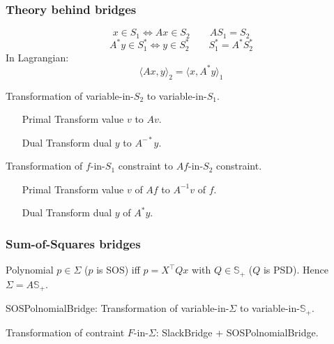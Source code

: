 \documentclass{beamer}
\begin{document}
  \begin{frame}
    \frametitle{Theory behind bridges}
    \[ x \in S_1 \Leftrightarrow Ax \in S_2 \qquad AS_1 = S_2 \]
    \[ A^* y \in S_1^* \Leftrightarrow y \in S_2^* \qquad S_1^* = A^* S_2^* \]
    In Lagrangian:
    \[ \langle Ax, y \rangle_2 = \langle x, A^* y \rangle_1 \]
    \vspace{-0.5cm}
    \begin{block}{Transformation of variable-in-$S_2$ to variable-in-$S_1$.}
%
      \begin{enumerate}
        \item[Primal] Transform value $v$ to $Av$.
        \item[Dual] Transform dual $y$ to $A^{-*}y$.
      \end{enumerate}
    \end{block}
    \begin{block}{Transformation of $f$-in-$S_1$ constraint to $Af$-in-$S_2$ constraint.}

      \begin{enumerate}
        \item[Primal] Transform value $v$ of $Af$ to $A^{-1}v$ of $f$.
        \item[Dual] Transform dual $y$ of $A^*y$.
      \end{enumerate}
    \end{block}
  \end{frame}

\begin{frame}
  \frametitle{Sum-of-Squares bridges}
  Polynomial $p \in \Sigma$ ($p$ is SOS) iff
  $p = X^\top Q x$ with $Q \in \mathbb{S}_+$ ($Q$ is PSD).
  Hence $\Sigma = A \mathbb{S}_+$.

  SOSPolnomialBridge: Transformation of variable-in-$\Sigma$ to variable-in-$\mathbb{S}_+$.

  Transformation of contraint $F$-in-$\Sigma$: SlackBridge + SOSPolnomialBridge.
\end{frame}
\end{document}
